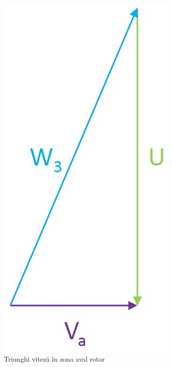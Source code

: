 \begin{figure}[h!]
	\centering
	\includegraphics[scale=0.5]{figures/triunghi_viteza_ZAR.jpg}
	\caption{Triunghi viteză în zona aval rotor}
	\label{Triunghi viteză în zona aval rotor}
\end{figure}

\clearpage

